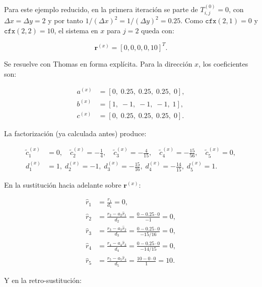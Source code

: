 \documentclass[11pt,a4paper]{article}
\begin{document}
Para este ejemplo reducido, en la primera iteraci\'on se parte de
\(T_{i,j}^{(0)}=0\), con \(\Delta x=\Delta y=2\) y por tanto
\(1/(\Delta x)^2=1/(\Delta y)^2=0.25\). Como \(\texttt{cfx}(2,1)=0\) y
\(\texttt{cfx}(2,2)=10\), el sistema en \(x\) para \(j=2\) queda con:

\begin{equation}
\mathbf{r}^{(x)} = [0,0,0,0,10]^T.
\end{equation}

Se resuelve con Thomas en forma expl\'icita. Para la direcci\'on \(x\), los
coeficientes son:

\begin{equation}
\begin{aligned}
a^{(x)} &= [0,\;0.25,\;0.25,\;0.25,\;0],\\
b^{(x)} &= [1,\;-1,\;-1,\;-1,\;1],\\
c^{(x)} &= [0,\;0.25,\;0.25,\;0.25,\;0].
\end{aligned}
\end{equation}

La factorizaci\'on (ya calculada antes) produce:

\begin{equation}
\begin{aligned}
\tilde c_1^{(x)}&=0, \quad \tilde c_2^{(x)}=-\frac14, \quad
\tilde c_3^{(x)}=-\frac{4}{15}, \quad \tilde c_4^{(x)}=-\frac{15}{56}, \quad
\tilde c_5^{(x)}=0,\\
d_1^{(x)}&=1,\; d_2^{(x)}=-1,\; d_3^{(x)}=-\frac{15}{16},\;
d_4^{(x)}=-\frac{14}{15},\; d_5^{(x)}=1.
\end{aligned}
\end{equation}

En la sustituci\'on hacia adelante sobre \(\mathbf r^{(x)}\):

\begin{equation}
\begin{aligned}
\hat r_1 &= \frac{r_1}{d_1} = 0,\\
\hat r_2 &= \frac{r_2-a_2\hat r_1}{d_2}
= \frac{0-0.25\cdot0}{-1}=0,\\
\hat r_3 &= \frac{r_3-a_3\hat r_2}{d_3}
= \frac{0-0.25\cdot0}{-15/16}=0,\\
\hat r_4 &= \frac{r_4-a_4\hat r_3}{d_4}
= \frac{0-0.25\cdot0}{-14/15}=0,\\
\hat r_5 &= \frac{r_5-a_5\hat r_4}{d_5}
= \frac{10-0\cdot0}{1}=10.
\end{aligned}
\end{equation}

Y en la retro-sustituci\'on:
\end{document}
